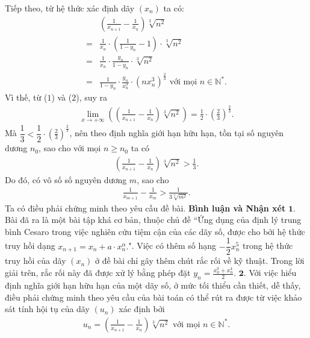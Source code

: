 \begin{multicols}{2}
	\vskip 0.05cm
	Tiếp theo, từ hệ thức xác định dãy $(x_n)$  ta có:
	\begin{align*}
		&\left( {\frac{1}{{{x_{n + 1}}}} - \frac{1}{{{x_n}}}} \right)\sqrt[3]{{{n^2}}}\\
		= &\frac{1}{{{x_n}}} \cdot \left( {\frac{1}{{1 - {y_n}}} - 1} \right) \cdot \sqrt[3]{{{n^2}}} \\
		= &\frac{1}{{{x_n}}} \cdot \frac{{{y_n}}}{{1 - {y_n}}} \cdot \sqrt[3]{{{n^2}}} \\
		= &\frac{1}{{1 - {y_n}}} \cdot \frac{{{y_n}}}{{x_n^3}} \cdot {\left( {nx_n^3} \right)^{\frac{2}{3}}} \text{ với mọi } n\in \mathbb{N^*}.
	\end{align*}  
	Vì thế, từ ($1$) và ($2$), suy ra
	\begin{align*}
		\mathop {\lim }\limits_{x \to +\infty } \left( {\left( {\frac{1}{{{x_{n + 1}}}} - \frac{1}{{{x_n}}}} \right)\sqrt[3]{{{n^2}}}} \right) = \frac{1}{2} \cdot {\left( {\frac{2}{3}} \right)^{\frac{2}{3}}}.
	\end{align*}
	Mà  $\dfrac{1}{3} < \dfrac{1}{2} \cdot {\left( {\frac{2}{3}} \right)^{\frac{2}{3}}}$, nên theo định nghĩa giới hạn hữu hạn, tồn tại số nguyên dương  $n_0$, sao cho với mọi $n \ge n_0$  ta có
	\begin{align*}
		\left( {\frac{1}{{{x_{n + 1}}}} - \frac{1}{{{x_n}}}} \right)\sqrt[3]{{{n^2}}} > \frac{1}{3}.
	\end{align*}
	Do đó, có vô số số nguyên dương $m$, sao cho
	\begin{align*}
		\frac{1}{{{x_{m + 1}}}} - \frac{1}{{{x_m}}} > \frac{1}{{3\sqrt[3]{{{m^2}}}}}.
	\end{align*}
	Ta có điều phải chứng minh theo yêu cầu đề bài.
	\vskip 0.05cm
	\textbf{\color{thachthuctoanhoc}Bình luận và Nhận xét}
	\vskip 0.05cm
	$\pmb{1.}$ Bài đã ra là một bài tập khá cơ bản, thuộc chủ đề ``Ứng dụng của định lý trung bình Cesaro trong việc nghiên cứu tiệm cận của các dãy số, được cho bởi hệ thức truy hồi dạng ${x_{n + 1}} = {x_n} + a \cdot x_n^\alpha .$". Việc có thêm số hạng $-\dfrac{1}{2}x_n^5$ trong hệ thức truy hồi của dãy $(x_n)$  ở đề bài chỉ gây thêm chút rắc rối về kỹ thuật. Trong lời giải trên, rắc rối này đã được xử lý bằng phép đặt  ${y_n} = \frac{{x_n^3 + x_n^4}}{2}$.
	\vskip 0.05cm
	$\pmb{2.}$ Với việc hiểu định nghĩa giới hạn hữu hạn của một dãy số, ở mức tối thiểu cần thiết, dễ thấy, điều phải chứng minh theo yêu cầu của bài toán có thể rút ra được từ việc khảo sát tính hội tụ của dãy $(u_n)$  xác định bởi
	\begin{align*}
		{u_n} = \left( {\frac{1}{{{x_{n + 1}}}} - \frac{1}{{{x_n}}}} \right)\sqrt[3]{{{n^2}}} \text{ với mọi } n \in \mathbb{N^*}.

\end{align*}
\end{multicols}
